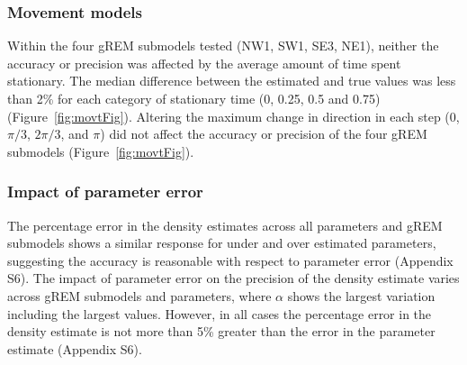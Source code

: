 
\subsubsection{Movement models}

Within the four gREM submodels tested (NW1, SW1, SE3, NE1), neither the accuracy or precision was affected by the average amount of time spent stationary.
The median difference between the estimated and true values was less than 2\% for each category of stationary time (0, 0.25, 0.5 and 0.75) (Figure~\ref{fig:movtFig}).
Altering the maximum change in direction in each step (0, $\pi/3$, $2\pi/3$, and $\pi$) did not affect the accuracy or precision of the four gREM submodels (Figure~\ref{fig:movtFig}). 

\subsubsection{Impact of parameter error}

The percentage error in the density estimates across all parameters and gREM submodels shows a similar response for under and over estimated parameters, suggesting the accuracy is reasonable with respect to parameter error (Appendix S6).
The impact of parameter error on the precision of the density estimate varies across gREM submodels and parameters, where $\alpha$ shows the largest variation including the largest values.
However, in all cases the percentage error in the density estimate is not more than 5\% greater than the error in the parameter estimate (Appendix S6).



